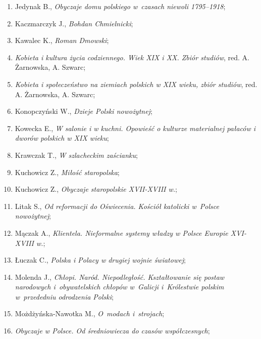 \documentclass[a4paper,11pt]{article}
\begin{document}
\begin{enumerate}
\item Jedynak B., \textit{Obyczaje domu polskiego w~czasach niewoli
    1795--1918};

\item Kaczmarczyk J., \textit{Bohdan Chmielnicki};

\item Kawalec K., \textit{Roman Dmowski};

\item \textit{Kobieta i kultura życia codziennego. Wiek XIX i XX. Zbiór
    studiów}, red. A. Żarnowska, A. Szwarc;

\item \textit{Kobieta i społeczeństwo na ziemiach polskich w XIX wieku,
    zbiór studiów}, red. A. Żarnowska, A. Szwarc;

\item Konopczyński W., \textit{Dzieje Polski nowożytnej};

\item Kowecka E., \textit{W salonie i w kuchni. Opowieść o kulturze
    materialnej pałaców i dworów polskich w XIX wieku};

\item Krawczak T., \textit{W szlacheckim zaścianku};

\item Kuchowicz Z., \textit{Miłość staropolska};

\item Kuchowicz Z., \textit{Obyczaje staropolskie XVII-XVIII w.};

\item Litak S., \textit{Od reformacji do Oświecenia. Kościół katolicki
    w~Polsce nowożytnej};

\item Mączak A., \textit{Klientela. Nieformalne systemy władzy w Polsce
    Europie XVI-XVIII w.};

\item Łuczak C., \textit{Polska i Polacy w drugiej wojnie światowej};

\item Molenda J., \textit{Chłopi. Naród. Niepodległość. Kształtowanie
    się postaw narodowych i~obywatelskich chłopów w~Galicji
    i~Królestwie polskim w~przededniu odrodzenia Polski};

\item Możdżyńska-Nawotka M., \textit{O~modach i~strojach};

\item \textit{Obyczaje w Polsce. Od średniowiecza do czasów
    współczesnych};


\end{enumerate}
\end{document}
